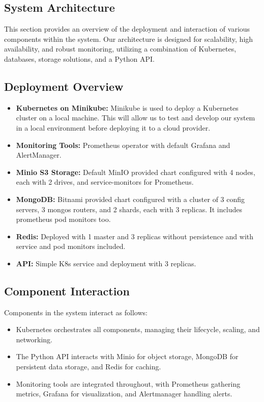 \documentclass{article}
\begin{document}
    \subsection{System Architecture}
    This section provides an overview of the deployment and interaction of various components within the system. Our architecture is designed for scalability, high availability, and robust monitoring, utilizing a combination of Kubernetes, databases, storage solutions, and a Python API.

    \subsection{Deployment Overview}

    \begin{itemize}
        \item \textbf{Kubernetes on Minikube:} Minikube is used to deploy a Kubernetes cluster on a local machine. This will allow us to test and develop our system in a local environment before deploying it to a cloud provider.
        \item \textbf{Monitoring Tools:} Prometheus operator with default Grafana and AlertManager.
        \item \textbf{Minio S3 Storage:} Default MinIO provided chart configured with 4 nodes, each with 2 drives, and service-monitors for Prometheus.
        \item \textbf{MongoDB:} Bitnami provided chart configured with a cluster of 3 config servers, 3 mongos routers, and 2 shards, each with 3 replicas. It includes prometheus pod monitors too.
        \item \textbf{Redis:} Deployed with 1 master and 3 replicas without persistence and with service and pod monitors included.
        \item \textbf{API:} Simple K8s service and deployment with 3 replicas.
    \end{itemize}

    \subsection{Component Interaction}

    Components in the system interact as follows:

    \begin{itemize}
        \item Kubernetes orchestrates all components, managing their lifecycle, scaling, and networking.
        \item The Python API interacts with Minio for object storage, MongoDB for persistent data storage, and Redis for caching.
        \item Monitoring tools are integrated throughout, with Prometheus gathering metrics, Grafana for visualization, and Alertmanager handling alerts.
    \end{itemize}
\end{document}
